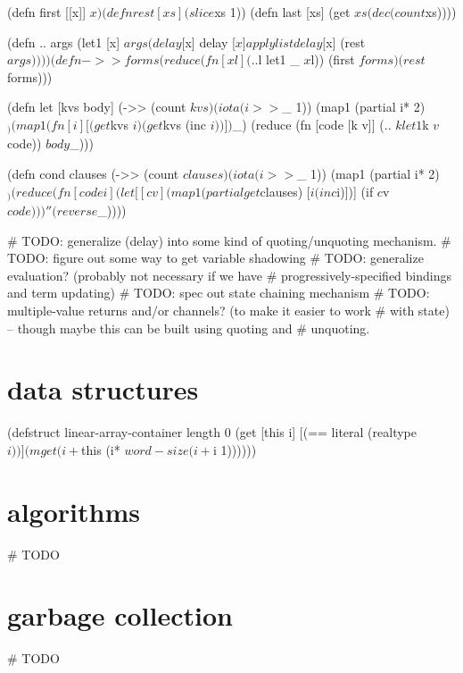 \documentclass{report}
\begin{document}
\begin{xhcode}
(defn first [[x]] $x)
(defn rest  [xs]  (slice $xs 1))
(defn last  [xs]  (get $xs (dec (count $xs))))

(defn .. args
  (let1 [x] $args
    (delay [$x]
     delay [$x]
     apply list delay [$x] (rest $args))))

(defn ->> forms
  (reduce (fn [x l] (.. $l let1 _ $x $l))
          (first $forms)
          (rest $forms)))

(defn let [kvs body]
  (->> (count $kvs)
       (iota (i>> $_ 1))
       (map1 (partial i* 2) $_)
       (map1 (fn [i] [(get $kvs $i) (get $kvs (inc $i))]) $_)
       (reduce (fn [code [k v]] (.. $k let1 $k $v $code))
               $body
               $_)))

(defn cond clauses
  (->> (count $clauses)
       (iota (i>> $_ 1))
       (map1 (partial i* 2) $_)
       (reduce (fn [code i]
                 (let [[c v] (map1 (partial get $clauses) [$i (inc $i)])]
                   (if $c $v $code)))
               ''
               (reverse $_))))

# TODO: generalize (delay) into some kind of quoting/unquoting mechanism.
# TODO: figure out some way to get variable shadowing
# TODO: generalize evaluation? (probably not necessary if we have
#   progressively-specified bindings and term updating)
# TODO: spec out state chaining mechanism
# TODO: multiple-value returns and/or channels? (to make it easier to work
#   with state) -- though maybe this can be built using quoting and
#   unquoting. \end{xhcode}

\chapter{data structures}\label{chp:data-structures}

\begin{xhcode}
(defstruct linear-array-container
  {length 0}
  (get [this i]
    [(== literal (realtype $i))]
    (mget (i+ $this (i* $word-size (i+ $i 1)))))) \end{xhcode}

\chapter{algorithms}\label{chp:algorithms}
\begin{xhcode}
# TODO \end{xhcode}

\chapter{garbage collection}\label{chp:garbage-collection}
\begin{xhcode}
# TODO \end{xhcode}
\end{document}
